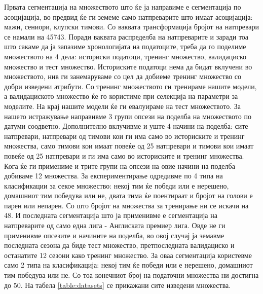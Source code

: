 Првата сегментација на множеството што ќе ја направиме е сегментација по асоцијација, во предвид ќе ги земеме само натпреварите што имаат асоцијација: мажи, сениори, клупски тимови. Со ваквата трансформација бројот на натпревари се намали на 45743. Поради ваквата распределба на натпреварите и заради тоа што сакаме да ја запазиме хронологијата на податоците, треба да го поделиме множеството на 4 дела: историски податоци, тренинг множество, валидациско множество и тест множество. Историските податоци нема да бидат вклучени во множеството, нив ги занемаруваме со цел да добиеме тренинг множество со добри изведени атрибути. Со тренинг множеството ги тренираме нашите модели, а валидациското множество ќе го користиме при селекција на параметри за моделите. На крај нашите модели ќе ги евалуираме на тест множеството. За нашето истражување направивме 3 групи опсези на поделба на множеството по датуми соодветно. Дополнително вклучивме и уште 4 начини на поделба: сите натпревари, натпревари од тимови кои ги има само во историските и тренинг множества, само тимови кои имаат повеќе од 25 натпревари и тимови кои имаат повеќе од 25 натпревари и ги има само во историските и тренинг множества. Кога ќе ги примениме и трите групи на опсези на овие начини на поделба добиваме 12 множества. За експериментирање одредивме по 4 типа на класификации за секое множество: некој тим ќе победи или е нерешено, домашниот тим победува или не, двата тима ќе поентираат и бројот на голови е парен или непарен.  Со што бројот на множества за тренирање ни се искачи на 48. И последната сегментација што ја применивме е сегментација на натпреварите од само една лига - Англиската премиер лига. Овде не ги применивме опсезите и начините на поделба, во овој случај ја земавме последната сезона да биде тест множество, претпоследната валидациско и останатите 12 сезони како тренинг множество. За оваа сегментација користевме само 2 типа на класификација: некој тим ќе победи или е нерешено, домашниот тим победува или не. Со тоа конечниот број на податочни множества ни достигна до 50. На табела \ref{table:datasets} се прикажани сите изведени множества.

